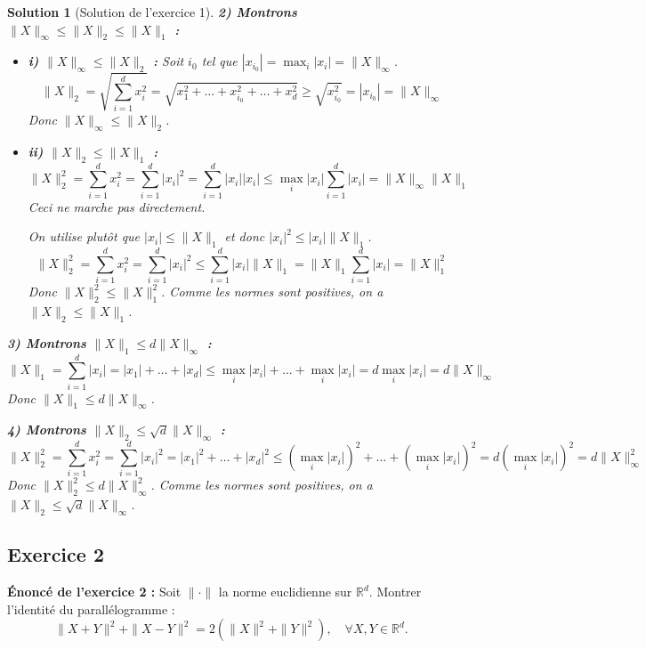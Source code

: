 \documentclass{article}
\newtheorem{solution}{Solution}
\begin{document}
\begin{solution}[Solution de l'exercice 1]
\textbf{2) Montrons $\|X\|_\infty \leq \|X\|_2 \leq \|X\|_1$ : }
\begin{itemize}
    \item \textbf{i) $\|X\|_\infty \leq \|X\|_2$ : }
    Soit $i_0$ tel que $|x_{i_0}| = \max_{i} |x_i| = \|X\|_\infty$.
    \[
    \|X\|_2 = \sqrt{\sum_{i=1}^d x_i^2} = \sqrt{x_1^2 + \dots + x_{i_0}^2 + \dots + x_d^2} \geq \sqrt{x_{i_0}^2} = |x_{i_0}| = \|X\|_\infty
    \]
    Donc $\|X\|_\infty \leq \|X\|_2$.

    \item \textbf{ii) $\|X\|_2 \leq \|X\|_1$ : }
    \[
    \|X\|_2^2 = \sum_{i=1}^d x_i^2 = \sum_{i=1}^d |x_i|^2 = \sum_{i=1}^d |x_i| |x_i| \leq \max_{i} |x_i| \sum_{i=1}^d |x_i| = \|X\|_\infty \|X\|_1
    \]
    Ceci ne marche pas directement.

    On utilise plutôt que $|x_i| \leq \|X\|_1$ et donc $|x_i|^2 \leq |x_i| \|X\|_1$.
    \[
    \|X\|_2^2 = \sum_{i=1}^d x_i^2 = \sum_{i=1}^d |x_i|^2 \leq \sum_{i=1}^d |x_i| \|X\|_1 = \|X\|_1 \sum_{i=1}^d |x_i| = \|X\|_1^2
    \]
    Donc $\|X\|_2^2 \leq \|X\|_1^2$. Comme les normes sont positives, on a $\|X\|_2 \leq \|X\|_1$.
\end{itemize}

\textbf{3) Montrons $\|X\|_1 \leq d \|X\|_\infty$ : }
\[
\|X\|_1 = \sum_{i=1}^d |x_i| = |x_1| + \dots + |x_d| \leq \max_{i} |x_i| + \dots + \max_{i} |x_i| = d \max_{i} |x_i| = d \|X\|_\infty
\]
Donc $\|X\|_1 \leq d \|X\|_\infty$.

\textbf{4) Montrons $\|X\|_2 \leq \sqrt{d} \|X\|_\infty$ : }
\[
\|X\|_2^2 = \sum_{i=1}^d x_i^2 = \sum_{i=1}^d |x_i|^2 = |x_1|^2 + \dots + |x_d|^2 \leq (\max_{i} |x_i|)^2 + \dots + (\max_{i} |x_i|)^2 = d (\max_{i} |x_i|)^2 = d \|X\|_\infty^2
\]
Donc $\|X\|_2^2 \leq d \|X\|_\infty^2$. Comme les normes sont positives, on a $\|X\|_2 \leq \sqrt{d} \|X\|_\infty$.
\end{solution}

\subsection{Exercice 2}

\textbf{Énoncé de l'exercice 2 :}
Soit $\|\cdot\|$ la norme euclidienne sur $\mathbb{R}^d$. Montrer l'identité du parallélogramme :
\[
\|X + Y\|^2 + \|X - Y\|^2 = 2(\|X\|^2 + \|Y\|^2), \quad \forall X, Y \in \mathbb{R}^d.
\]
\end{document}
